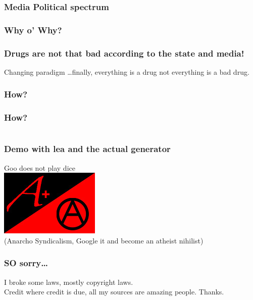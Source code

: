 \documentclass[a4paper]{beamer}
\begin{document}
\begin{frame}
\frametitle{Media Political spectrum}
\end{frame}

\begin{frame}
\frametitle{Why o' Why?}
\end{frame}

\begin{frame}
	\frametitle{Drugs are not that bad according to the state and media!}
	Changing paradigm \ldots finally, everything is a drug not everything is a bad drug.
\end{frame}

\begin{frame}
	\frametitle{How?}
\end{frame}

\begin{frame}
	\frametitle{How?}
	\inputminted[firstline=1, lastline=6, gobble=0, linenos, mathescape, bgcolor=bg, numbersep=8pt, frame=lines, framesep=3mm, fontsize=\scriptsize]{python}{code/bh.py}
\end{frame}

\begin{frame}
	\frametitle{Demo with lea and the actual generator}
	Goo does not play dice
	\\
	\includegraphics[scale=0.60]{img/mjr_anarchist_flag.jpg}
	\\
	(Anarcho Syndicalism, Google it and become an atheist nihilist)
\end{frame}

\begin{frame}
	\frametitle{SO sorry\ldots}
	I broke some laws, mostly copyright laws.
	\\
	Credit where credit is due, all my sources are amazing people. Thanks.
\end{frame}
\end{document}
